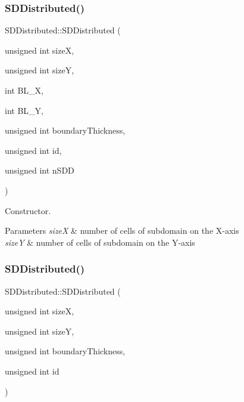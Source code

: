 \subsubsection{\texorpdfstring{S\+D\+Distributed()}{SDDistributed()}\hspace{0.1cm}{\footnotesize\ttfamily [1/2]}}
{\footnotesize\ttfamily S\+D\+Distributed\+::\+S\+D\+Distributed (\begin{DoxyParamCaption}\item[{unsigned int}]{sizeX,  }\item[{unsigned int}]{sizeY,  }\item[{int}]{B\+L\+\_\+X,  }\item[{int}]{B\+L\+\_\+Y,  }\item[{unsigned int}]{boundary\+Thickness,  }\item[{unsigned int}]{id,  }\item[{unsigned int}]{n\+S\+DD }\end{DoxyParamCaption})}



Constructor. 


\begin{DoxyParams}{Parameters}
{\em sizeX} & number of cells of subdomain on the X-\/axis \\
\hline
{\em sizeY} & number of cells of subdomain on the Y-\/axis \\
\hline
\end{DoxyParams}
\mbox{\label{classSDDistributed_a49ef3cd6d1409cc71d3800fd0fca2f28}} 
\subsubsection{\texorpdfstring{S\+D\+Distributed()}{SDDistributed()}\hspace{0.1cm}{\footnotesize\ttfamily [2/2]}}
{\footnotesize\ttfamily S\+D\+Distributed\+::\+S\+D\+Distributed (\begin{DoxyParamCaption}\item[{unsigned int}]{sizeX,  }\item[{unsigned int}]{sizeY,  }\item[{unsigned int}]{boundary\+Thickness,  }\item[{unsigned int}]{id }\end{DoxyParamCaption})}



